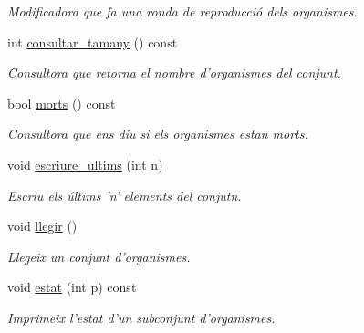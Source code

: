 \begin{DoxyCompactItemize}
\begin{DoxyCompactList}\small\item\em Modificadora que fa una ronda de reproducció dels organismes. \end{DoxyCompactList}\item 
int \hyperlink{class_conjunt_org_adbce2716cb543fa4d513c6d2a21b4fe1}{consultar\-\_\-tamany} () const 
\begin{DoxyCompactList}\small\item\em Consultora que retorna el nombre d'organismes del conjunt. \end{DoxyCompactList}\item 
bool \hyperlink{class_conjunt_org_aa250202ccc4d06ead8b11c9b26c2f28d}{morts} () const 
\begin{DoxyCompactList}\small\item\em Consultora que ens diu si els organismes estan morts. \end{DoxyCompactList}\item 
void \hyperlink{class_conjunt_org_ae14165ea78d2707b8c80d1ccf7c2cf41}{escriure\-\_\-ultims} (int n)
\begin{DoxyCompactList}\small\item\em Escriu els últims 'n' elements del conjutn. \end{DoxyCompactList}\item 
void \hyperlink{class_conjunt_org_aa933556b09efa171f23abed943fe78a7}{llegir} ()
\begin{DoxyCompactList}\small\item\em Llegeix un conjunt d'organismes. \end{DoxyCompactList}\item 
void \hyperlink{class_conjunt_org_a0c57d7702a556a7e9fe1a819414845a7}{estat} (int p) const 
\begin{DoxyCompactList}\small\item\em Imprimeix l'estat d'un subconjunt d'organismes. \end{DoxyCompactList}\end{DoxyCompactItemize}
